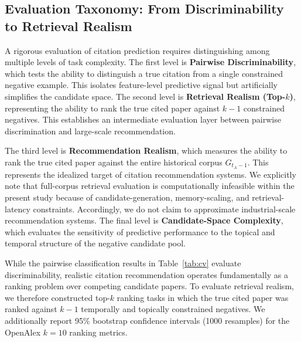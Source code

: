 \documentclass[11pt,a4paper]{article}
\begin{document}
\subsection{Evaluation Taxonomy: From Discriminability to Retrieval Realism}

A rigorous evaluation of citation prediction requires distinguishing among multiple levels of task complexity. The first level is \textbf{Pairwise Discriminability}, which tests the ability to distinguish a true citation from a single constrained negative example. This isolates feature-level predictive signal but artificially simplifies the candidate space. The second level is \textbf{Retrieval Realism (Top-\(k\))}, representing the ability to rank the true cited paper against \(k-1\) constrained negatives. This establishes an intermediate evaluation layer between pairwise discrimination and large-scale recommendation. 

The third level is \textbf{Recommendation Realism}, which measures the ability to rank the true cited paper against the entire historical corpus \(G_{t_A-1}\). This represents the idealized target of citation recommendation systems. We explicitly note that full-corpus retrieval evaluation is computationally infeasible within the present study because of candidate-generation, memory-scaling, and retrieval-latency constraints. Accordingly, we do not claim to approximate industrial-scale recommendation systems. The final level is \textbf{Candidate-Space Complexity}, which evaluates the sensitivity of predictive performance to the topical and temporal structure of the negative candidate pool.

While the pairwise classification results in Table~\ref{tab:cv} evaluate discriminability, realistic citation recommendation operates fundamentally as a ranking problem over competing candidate papers. To evaluate retrieval realism, we therefore constructed top-\(k\) ranking tasks in which the true cited paper was ranked against \(k-1\) temporally and topically constrained negatives. We additionally report 95\% bootstrap confidence intervals (1000 resamples) for the OpenAlex \(k=10\) ranking metrics.
\end{document}
